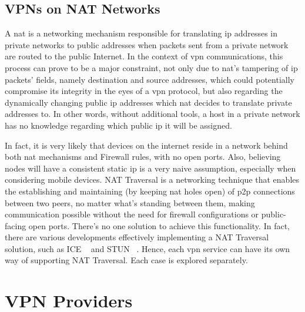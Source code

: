 \documentclass[11pt,twoside,a4paper]{report}
\begin{document}

\subsection{VPNs on NAT Networks}

A \ac{nat} is a networking mechanism responsible for translating \ac{ip} addresses in private networks to public addresses when packets sent from a private network are routed to the public Internet. In the context of \ac{vpn} communications, this process can prove to be a major constraint, not only due to \ac{nat}'s tampering of \ac{ip} packets' fields, namely destination and source addresses, which could potentially compromise its integrity in the eyes of a \ac{vpn} protocol, but also regarding the dynamically changing public \ac{ip} addresses which \ac{nat} decides to translate private addresses to. In other words, without additional tools, a host in a private network has no knowledge regarding which public \ac{ip} it will be assigned.

In fact, it is very likely that devices on the internet reside in a network behind both \ac{nat} mechanisms and Firewall rules, with no open ports. Also, believing nodes will have a consistent static \ac{ip} is a very naive assumption, especially when considering mobile devices. NAT Traversal is a networking technique that enables the establishing and maintaining (by keeping \ac{nat} holes open) of \ac{p2p} connections between two peers, no matter what's standing between them, making communication possible without the need for firewall configurations or public-facing open ports. There's no one solution to achieve this functionality. In fact, there are various developments effectively implementing a NAT Traversal solution, such as ICE ~\cite{rfc8445} and STUN ~\cite{rfc8489}. Hence, each \ac{vpn} service can have its own way of supporting NAT Traversal. Each case is explored separately.

\section{VPN Providers}
\end{document}
